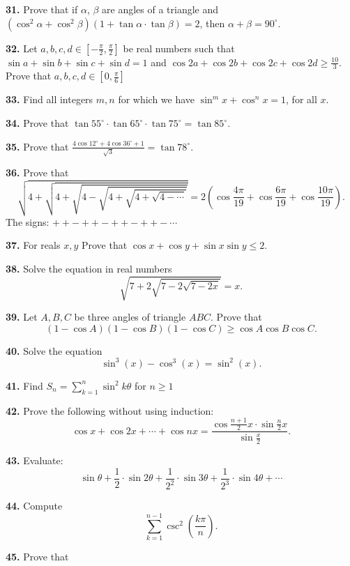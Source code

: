 \documentclass{article}
\begin{document}
\noindent
{\bf 31.} Prove that if $ \alpha$, $ \beta$ are angles of a triangle and $ \left(\cos^2\alpha+ \cos^2\beta\right)\left(1+ \tan\alpha \cdot \tan\beta\right)= 2$, then $ \alpha + \beta= 90^{\circ}.$

\singlespacing
\noindent
{\bf 32.} Let $a,b,c,d \in [-\frac{\pi}{2}, \frac{\pi}{2}]$ be real numbers such that
$\sin{a}+\sin{b}+\sin{c}+\sin{d}=1$ and $\cos{2a}+\cos{2b}+\cos{2c}+\cos{2d}\geq \frac{10}{3}$.
Prove that $a,b,c,d \in [0, \frac{\pi}{6}]$

\doublespacing
\noindent
{\bf 33.} Find all integers $m,n$ for which we have $\sin^{m}x+\cos^{n}x=1$, for all $x.$

\noindent
{\bf 34.} Prove that $\tan 55^{\circ} \cdot \tan 65^{\circ} \cdot \tan 75^{\circ}=\tan 85^{\circ}.$

\noindent
{\bf 35.} Prove that $\frac{4 \cos12^{\circ}+4 \cos 36^{\circ}+1}{\sqrt{3}}=\tan 78^{\circ}.$

\noindent
{\bf 36.} Prove that
\[ \sqrt{4+\sqrt{4+\sqrt{4-\sqrt{4+\sqrt{4+\sqrt{4-\cdots}}}}}}=2\left(\cos\frac{4\pi}{19}+\cos\frac{6\pi}{19}+\cos\frac{10\pi}{19}\right).\]
The signs: $ ++-++-++-++-\cdots$

\noindent
{\bf 37.} For reals $x,y$ Prove that $\cos{x}+\cos{y}+\sin{x}\sin{y}\leq 2.$


\noindent
{\bf 38.} Solve the equation in real numbers
\[\sqrt{7+2\sqrt{7-2\sqrt{7-2x}}}=x.\]

\singlespacing
\noindent
{\bf 39.} Let $A,B,C$ be three angles of triangle $ABC$. Prove that
\[(1-\cos A)(1-\cos B)(1-\cos C)\geq \cos A\cos B\cos C.\]

\noindent
{\bf 40.} Solve the equation \[ \sin^3 \left( x \right) - \cos^3 \left( x \right) = \sin^2 \left( x \right).\]

\doublespacing
\noindent
{\bf 41.} Find $S_n=\sum_{k=1}^n\sin^2 k\theta$ for $n\geqslant 1$

\noindent
{\bf 42.} Prove the following without using induction:
\[\cos x + \cos 2x + \cdots + \cos nx = \frac{\cos \frac{n+1}{2}x \cdot \sin \frac{n}{2}x}{\sin \frac{x}{2}}.\]

\singlespacing
\noindent
{\bf 43.} Evaluate:
\[ \sin \theta + \frac{1}{2}\cdot \sin 2 \theta + \frac{1}{2^2} \cdot \sin 3 \theta + \frac{1}{2^3} \cdot \sin 4\theta+\cdots \]

\doublespacing
\noindent
{\bf 44.} Compute \[\displaystyle \sum_{k=1}^{n-1}\csc^2 \left( \frac{k\pi}{n} \right) .\]

\noindent
{\bf 45.} Prove that
\end{document}
